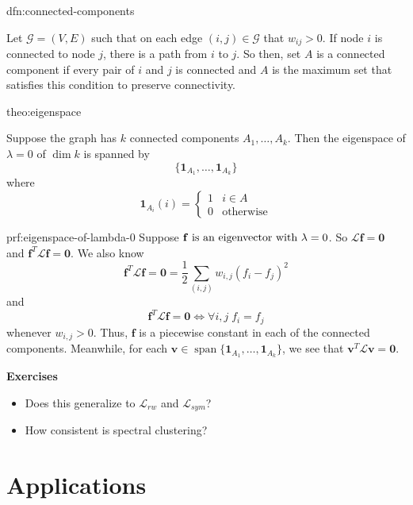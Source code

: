 \documentclass[12pt]{article}
\theoremstyle{plain}
\DeclareMathOperator*{\Span}{span}
\begin{document}
\begin{dfn}{dfn:connected-components}

Let $ \mathcal{G} = (V, E) $ such that on each edge $ (i, j) \in \mathcal{G} $ that $ w_{ij} > 0 $.
If node $ i $ is connected to node $ j $, there is a path from $ i $ to $ j $.
So then, set $ A $ is a connected component if every pair of $ i $ and $ j $ is connected and $ A $ is the maximum set that satisfies this condition to preserve connectivity.

\end{dfn}

\begin{theo}[Eigenspace of $ \lambda = 0 $ of $\mathcal{L}$]{theo:eigenspace}

Suppose the graph has $ k $ connected components $ A_{1}, \ldots, A_{k} $.
Then the eigenspace of $ \lambda = 0 $ of $ \dim{k} $ is spanned by
\[
\{ \mathbf{1}_{A_{1}}, \ldots, \mathbf{1}_{A_{k}} \}
\]
where
\[
\mathbf{1}_{A_{i}} (i) =
\begin{cases}
  1 & i \in A \\
  0 & \text{otherwise}
\end{cases}
\]

\end{theo}

\begin{prf}[Eigenspace of $ \lambda = 0 $ of $\mathcal{L}$, Theorem~\ref{theo:eigenspace}]{prf:eigenspace-of-lambda-0}
	Suppose \( \mathbf{f}$ is an eigenvector with  $\lambda = 0 \).
  So \( \mathcal{L}\bm{f} = \bm{0} \) and \( \textbf{f}^T\mathcal{L}\bm{f} = \bm{0} \).
  We also know
  \[
    \bm{f}^T\mathcal{L}\bm{f} = \bm{0} = \frac{1}{2} \sum_{(i,j)}w_{i,j}(f_i-f_j)^2
  \]
  and
  \[
    \bm{f}^T\mathcal{L}\bm{f} = \bm{0} \iff \forall i, j \; f_i = f_j
  \]
  whenever \( w_{i,j} > 0 \).
  Thus, \( \bm{f} \) is a piecewise constant in each of the connected components.
  Meanwhile, for each \( \bm{v} \in \Span{ \{ \mathbf{1}_{A_{1}}, \ldots, \mathbf{1}_{A_{k}} \} }\), we see that \( \bm{v}^T \mathcal{L} \bm{v} = \bm{0} \).
\end{prf}
\textbf{Exercises}
\begin{itemize}
	\item Does this generalize to \( \mathcal{L}_{rw} \) and \( \mathcal{L}_{sym} \)?
	\item How consistent is spectral clustering?
\end{itemize}

\section{Applications}
\end{document}
